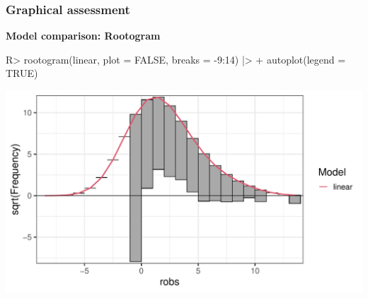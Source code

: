 \documentclass[11pt,t,usepdftitle=false,aspectratio=169]{beamer}
\begin{document}
\begin{frame}[fragile]
\addtocounter{framenumber}{-1}
\frametitle{Graphical assessment}

\vspace{-0.75em}

\textbf{Model comparison: Rootogram}

\vspace{0.5em}

\begin{Schunk}
\begin{Sinput}
R> rootogram(linear, plot = FALSE, breaks = -9:14) |>
+    autoplot(legend = TRUE)
\end{Sinput}
\end{Schunk}

\begin{center}
\includegraphics{slides-rain_topmodels_lm_rootogram}
\end{center}

\end{frame}
\end{document}
